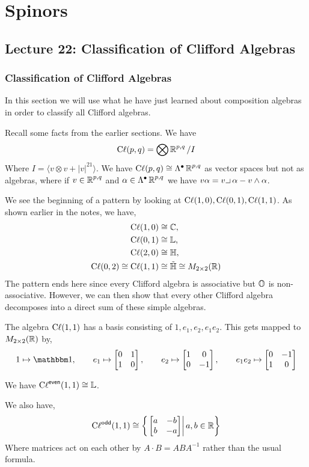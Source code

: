 \section{Spinors}

\subsection{Lecture 22: Classification of Clifford Algebras}
\subsubsection{Classification of Clifford Algebras}

In this section we will use what he have just learned about composition algebras in order to classify all Clifford algebras.
\begin{remark*}
    Recall some facts from the earlier sections. We have
    \[\operatorname{C\ell}(p,q) = \bigotimes \operatorname{\mathbb{R}}^{p,q}/I\]
    Where $I = \langle v\otimes v+|v|^21\rangle$. We have $\operatorname{C\ell}(p,q)\cong \Lambda^\bullet \operatorname{\mathbb{R}}^{p,q}$ as vector spaces but not as algebras, where if $v\in \operatorname{\mathbb{R}}^{p,q}$ and $\alpha\in \Lambda^\bullet \operatorname{\mathbb{R}}^{p,q}$ we have $v\alpha = v\hk\alpha - v\wedge \alpha$.
\end{remark*}
\begin{example}
    We see the beginning of a pattern by looking at $\operatorname{C\ell}(1,0),\operatorname{C\ell}(0,1),\operatorname{C\ell}(1,1)$. As shown earlier in the notes, we have,
    \begin{align*}
        \operatorname{C\ell}(1,0) &\cong \operatorname{\mathbb{C}},\\
        \operatorname{C\ell}(0,1) &\cong \operatorname{\mathbb{L}},\\
        \operatorname{C\ell}(2,0) &\cong \operatorname{\mathbb{H}}, \\
        \operatorname{C\ell}(0,2)\cong\operatorname{C\ell}(1,1) &\cong \tilde{\operatorname{\mathbb{H}}} \cong M_{2\times 2}(\operatorname{\mathbb{R}})
    \end{align*}
    The pattern ends here since every Clifford algebra is associative but $\operatorname{\mathbb{O}}$ is non-associative. However, we can then show that every other Clifford algebra decomposes into a direct sum of these simple algebras.
\end{example}

\begin{example}
    The algebra $\operatorname{C\ell}(1,1)$ has a basis consisting of $1,e_1,e_2,e_1e_2$. This gets mapped to $M_{2\times 2}(\operatorname{\mathbb{R}})$ by,
    \[1\mapsto \One, \qquad e_1 \mapsto \m{0&1\\1&0},\qquad e_2 \mapsto \m{1&0\\0&-1},\qquad e_1e_2 \mapsto \m{0&-1\\1&0}\]
\end{example}
\begin{example}
    We have $\operatorname{C\ell}^{\textsf{even}}(1,1) \cong \operatorname{\mathbb{L}}$.

    We also have,
    \[\operatorname{C\ell}^{\textsf{odd}}(1,1) \cong \left\{\left.\begin{bmatrix}a&-b\\b&-a\end{bmatrix} \right| a,b\in\operatorname{\mathbb{R}}\right\}\]
    Where matrices act on each other by $A\cdot B = ABA^{-1}$ rather than the usual formula.
\end{example}

